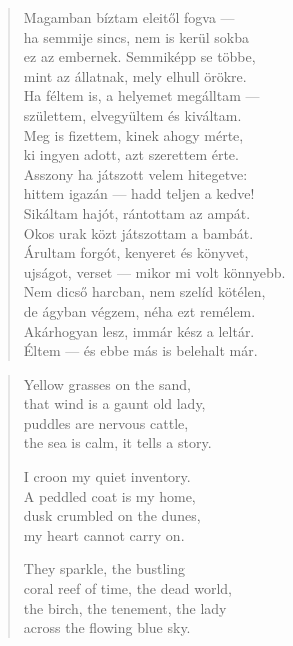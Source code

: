 \documentclass[11pt]{extbook}
\newcommand*{\centeredornament}{\centerline{\pgfornament[width=6cm]{88}}}
\begin{document}
\begin{verse}
  Magamban bíztam eleitől fogva --- \\
  ha semmije sincs, nem is kerül sokba \\
  ez az embernek. Semmiképp se többe, \\
  mint az állatnak, mely elhull örökre. \\
  Ha féltem is, a helyemet megálltam --- \\
  születtem, elvegyültem és kiváltam. \\
  Meg is fizettem, kinek ahogy mérte, \\
  ki ingyen adott, azt szerettem érte. \\
  Asszony ha játszott velem hitegetve: \\
  hittem igazán --- hadd teljen a kedve! \\
  Sikáltam hajót, rántottam az ampát. \\
  Okos urak közt játszottam a bambát. \\
  Árultam forgót, kenyeret és könyvet, \\
  ujságot, verset --- mikor mi volt könnyebb. \\
  Nem dicső harcban, nem szelíd kötélen, \\
  de ágyban végzem, néha ezt remélem. \\
  Akárhogyan lesz, immár kész a leltár. \\
  Éltem --- és ebbe más is belehalt már.
\end{verse}

\newpage


\vspace*{-15mm}
\centeredornament



\begin{verse}
  Yellow grasses on the sand, \\
  that wind is a gaunt old lady, \\
  puddles are nervous cattle, \\
  the sea is calm, it tells a story.

  I croon my quiet inventory. \\
  A peddled coat is my home, \\
  dusk crumbled on the dunes, \\
  my heart cannot carry on.

  They sparkle, the bustling \\
  coral reef of time, the dead world, \\
  the birch, the tenement, the lady \\
  across the flowing blue sky.
\end{verse}
\end{document}
